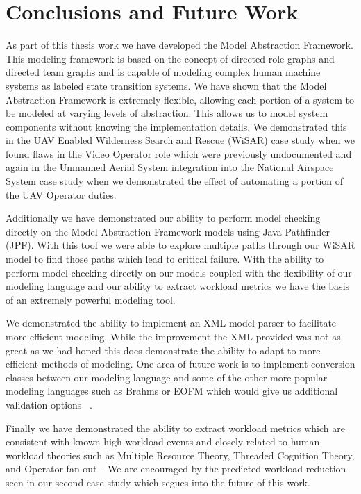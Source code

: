 \chapter{Conclusions and Future Work}

As part of this thesis work we have developed the Model Abstraction Framework.  This modeling framework is based on the concept of directed role graphs and directed team graphs and is capable of modeling complex human machine systems as labeled state transition systems.  We have shown that the Model Abstraction Framework is extremely flexible, allowing each portion of a system to be modeled at varying levels of abstraction.  This allows us to model system components without knowing the implementation details.  We demonstrated this in the UAV Enabled Wilderness Search and Rescue (WiSAR) case study when we found flaws in the Video Operator role which were previously undocumented and again in the Unmanned Aerial System integration into the National Airspace System case study when we demonstrated the effect of automating a portion of the UAV Operator duties.  

Additionally we have demonstrated our ability to perform model checking directly on the Model Abstraction Framework models using Java Pathfinder (JPF).  With this tool we were able to explore multiple paths through our WiSAR model to find those paths which lead to critical failure.  With the ability to perform model checking directly on our models coupled with the flexibility of our modeling language and our ability to extract workload metrics we have the basis of an extremely powerful modeling tool.

We demonstrated the ability to implement an XML model parser to facilitate more efficient modeling.  While the improvement the XML provided was not as great as we had hoped this does demonstrate the ability to adapt to more efficient methods of modeling.  One area of future work is to implement conversion classes between our modeling language and some of the other more popular modeling languages such as Brahms or EOFM which would give us additional validation options ~\cite{bolton2013litreview}.

Finally we have demonstrated the ability to extract workload metrics which are consistent with known high workload events and closely related to human workload theories such as Multiple Resource Theory, Threaded Cognition Theory, and Operator fan-out~\cite{wickens2002multiple, salvucci2008threaded, cummings2007predicting}.  We are encouraged by the predicted workload reduction seen in our second case study which segues into the future of this work.

